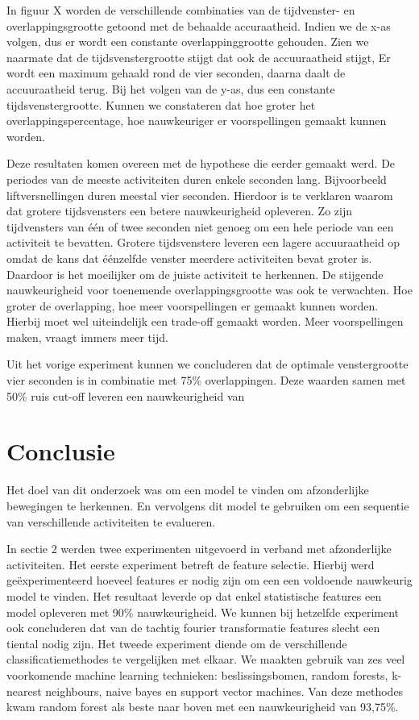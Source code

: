 \documentclass{article}
\begin{document}

In figuur X worden de verschillende combinaties van de tijdvenster- en overlappingsgrootte getoond met de behaalde accuraatheid. Indien we de x-as volgen, dus er wordt een constante overlappinggrootte gehouden. Zien we naarmate  dat de tijdsvenstergrootte stijgt dat ook de accuuraatheid stijgt, Er wordt een maximum gehaald rond de vier seconden, daarna daalt de accuuraatheid terug. Bij het volgen van de y-as, dus een constante tijdsvenstergrootte. Kunnen we constateren dat hoe groter het overlappingspercentage, hoe nauwkeuriger er voorspellingen gemaakt kunnen worden.

Deze resultaten komen overeen met de hypothese die eerder gemaakt werd. De periodes van de meeste activiteiten duren enkele seconden lang. Bijvoorbeeld liftversnellingen duren meestal vier seconden. Hierdoor is te verklaren waarom dat grotere tijdsvensters een betere nauwkeurigheid opleveren. Zo zijn tijdvensters van \'e\'en of twee seconden niet genoeg om een hele periode van een activiteit te bevatten. Grotere tijdsvenstere leveren een lagere accuuraatheid op omdat de kans dat \'e\'enzelfde venster meerdere activiteiten bevat groter is. Daardoor is het moeilijker om de juiste activiteit te herkennen. De stijgende nauwkeurigheid voor toenemende overlappingsgrootte was ook te verwachten. Hoe groter de overlapping, hoe meer voorspellingen er gemaakt kunnen worden. Hierbij moet wel uiteindelijk een trade-off gemaakt worden. Meer voorspellingen maken, vraagt immers meer tijd.

	Uit het vorige experiment kunnen we concluderen dat de optimale venstergrootte vier seconden is in combinatie met 75\% overlappingen. Deze waarden samen met 50\% ruis cut-off leveren een nauwkeurigheid van %



	

\section{Conclusie}

Het doel van dit onderzoek was om een model te vinden om afzonderlijke bewegingen te herkennen. En vervolgens dit model te gebruiken om een sequentie van verschillende activiteiten te evalueren.

	In sectie 2 werden twee experimenten uitgevoerd in verband met afzonderlijke activiteiten. Het eerste experiment betreft de feature selectie. Hierbij werd ge\"experimenteerd hoeveel features er nodig zijn om een een voldoende nauwkeurig model te vinden. Het resultaat leverde op dat enkel statistische features een model opleveren met 90\% nauwkeurigheid. We kunnen bij hetzelfde experiment ook concluderen dat van de tachtig fourier transformatie features slecht een tiental nodig zijn.
	Het tweede experiment diende om de verschillende classificatiemethodes te vergelijken met elkaar. We maakten gebruik van zes veel voorkomende machine learning technieken: beslissingsbomen, random forests, k-nearest neighbours, naive bayes en support vector machines. Van deze methodes kwam random forest als beste naar boven met een nauwkeurigheid van 93,75\%.
	
\end{document}
